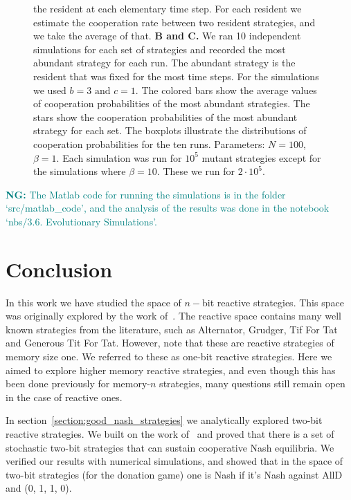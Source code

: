 \documentclass{article}
\theoremstyle{definition}
\newcommand{\nikoleta}[1]{\textcolor{teal}{{\bf NG:} #1}}
\begin{document}
\begin{figure}[htbp]
{  the resident at each elementary time step. For each resident we estimate the
  cooperation rate between two resident strategies, and we take the average of
  that. 
  \textbf{B and C.} We ran 10 independent simulations for each set of strategies
  and recorded the most abundant strategy for each run. The abundant strategy is
  the resident that was fixed for the most time steps. For the simulations we
  used \(b=3 \text{ and } c=1\). The colored bars show the average values of
  cooperation probabilities of the most abundant strategies. The stars show the
  cooperation probabilities of the most abundant strategy for each set. The
  boxplots illustrate the distributions of cooperation probabilities for the ten
  runs.
  Parameters: \(N=100\), \(\beta=1\). Each simulation was run for \(10 ^ {5}\)
  mutant strategies except for the simulations where \(\beta=10\). These we
  run for \(2 \cdot 10 ^ {5}\).}\label{fig:three_graphs}
\end{figure}

\nikoleta{The Matlab code for running the simulations is in the folder
`src/matlab\_code', and the analysis of the results was done in the
notebook `nbs/3.6. Evolutionary Simulations'.}

\section{Conclusion}

In this work we have studied the space of \(n-\)bit reactive strategies. This
space was originally explored by the work of~\citep{nowak:AAM:1990}. The
reactive space contains many well known strategies from the literature, such as
Alternator, Grudger, Tif For Tat and Generous Tit For Tat. However, note that
these are reactive strategies of memory size one. We referred to these as
one-bit reactive strategies. Here we aimed to explore higher memory reactive
strategies, and even though this has been done previously for memory-\(n\)
strategies, many questions still remain open in the case of reactive ones.

In section~\ref{section:good_nash_strategies} we analytically explored two-bit
reactive strategies. We built on the work of~\citep{akin:EGADS:2016} and proved
that there is a set of stochastic two-bit strategies that can sustain
cooperative Nash equilibria. We verified our results with numerical simulations,
and showed that in the space of two-bit strategies (for the donation game) one
is Nash if it's Nash against AllD and (0, 1, 1, 0).
\end{document}

